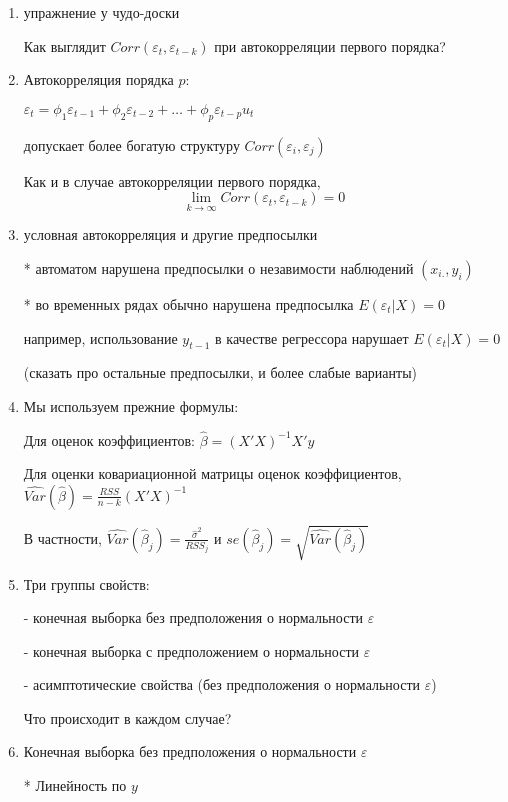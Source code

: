 \documentclass[12pt,a4paper]{article}
\begin{document}
{\begin{enumerate}
\item упражнение у чудо-доски

Как выглядит $Corr(\varepsilon_{t}, \varepsilon_{t-k})$ при автокорреляции первого порядка?

\newpage
\item Автокорреляция порядка $p$:

$\varepsilon_{t}=\phi_1 \varepsilon_{t-1}+\phi_2 \varepsilon_{t-2} +\ldots + \phi_p \varepsilon_{t-p}u_t$

допускает более богатую структуру $Corr(\varepsilon_i, \varepsilon_j)$

Как и в случае автокорреляции первого порядка, 
\[
\lim_{k\to\infty} Corr(\varepsilon_t, \varepsilon_{t-k})=0
\]

\item условная автокорреляция и другие предпосылки

* автоматом нарушена предпосылки о незавимости наблюдений $(x_{i.}, y_i)$  

* во временных рядах обычно нарушена предпосылка $E(\varepsilon_t | X)=0$

например, использование $y_{t-1}$ в качестве регрессора нарушает $E(\varepsilon_t | X)=0$

(сказать про остальные предпосылки, и более слабые варианты)

\newpage
\item  Мы используем прежние формулы:

Для оценок коэффициентов:
$\hat{\beta}=(X'X)^{-1}X'y$

Для оценки ковариационной матрицы оценок коэффициентов,
$\widehat{Var}(\hat{\beta})=\frac{RSS}{n-k}(X'X)^{-1}$

В частности, $\widehat{Var}(\hat{\beta}_j)=\frac{\hat{\sigma}^2}{RSS_j}$
и $se(\hat{\beta}_j)=\sqrt{\widehat{Var}(\hat{\beta}_j)}$


\item Три группы свойств:

- конечная выборка без предположения о нормальности $\varepsilon$

- конечная выборка с предположением о нормальности $\varepsilon$

- асимптотические свойства (без предположения о нормальности  $\varepsilon$)

Что происходит в каждом случае?
\newpage
\item Конечная выборка без предположения о нормальности $\varepsilon$

* Линейность по $y$


\end{enumerate}}
\end{document}

